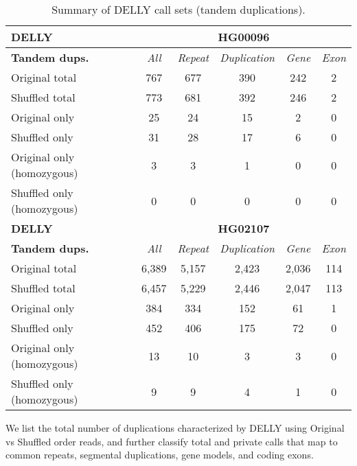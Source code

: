 \begin{table}[htb]
\caption{ Summary of DELLY call sets (tandem duplications). }
\begin{center}
\begin{tabular}{|l|c||c|c|c|c|}
\hline
{\bf DELLY} & \multicolumn{5}{|c|}{\bf HG00096} \\
\hline
\cline{2-6}
{\bf Tandem dups.} & {\it All} & {\it Repeat} & {\it Duplication} & {\it Gene} & {\it Exon} \\
\hline
Original total & 767 & 677 & 390 & 242 & 2\\ 
\hline
Shuffled total & 773 & 681 & 392 & 246 & 2\\ 
\hline
Original only & 25 & 24 & 15 & 2 & 0\\ 
\hline
Shuffled only & 31 & 28 & 17 & 6 & 0\\ 
\hline
Original only (homozygous) & 3 & 3 & 1 & 0 & 0\\ 
\hline
Shuffled only (homozygous) & 0 & 0 & 0 & 0 & 0\\ 
\hline
\hline
{\bf DELLY} & \multicolumn{5}{|c|}{\bf HG02107} \\
\hline
\cline{2-6}
{\bf Tandem dups.} & {\it All} & {\it Repeat} & {\it Duplication} & {\it Gene} & {\it Exon} \\
\hline
Original total & 6,389 & 5,157 & 2,423 & 2,036 & 114\\ 
\hline
Shuffled total & 6,457 & 5,229 & 2,446 & 2,047 & 113\\ 
\hline
Original only & 384 & 334 & 152 & 61 & 1\\ 
\hline
Shuffled only & 452 & 406 & 175 & 72 & 0\\ 
\hline
Original only (homozygous) & 13 & 10 & 3 & 3 & 0\\ 
\hline
Shuffled only (homozygous) & 9 & 9 & 4 & 1 & 0\\ 
\hline
\end{tabular}
\end{center}
{\footnotesize We list the total number of duplications characterized by DELLY using Original vs Shuffled order reads, 
and further classify total and private calls that map to common repeats, segmental duplications, gene models, and coding exons.}
\label{supptab:orig-vs-shuf-delly-dups}
\end{table}

